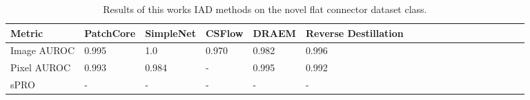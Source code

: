 \begin{table}[htbp]
    \tiny
    \centering
    \begin{tabularx}{\textwidth}{|X|X|X|X|X|X|X|X|X|X|X|X|X|X|X|X|X|X|}%
        \hline
        \textbf{Metric} & \textbf{PatchCore} \cite{patchCore2022} & \textbf{SimpleNet} \cite{liu2023simplenet} & \textbf{CSFlow }\cite{csflow2022} & \textbf{DRAEM} \cite{Zavrtanik_2021DRAEM} & \textbf{Reverse Destillation} \cite{revdist2023} \\
        \hline
        Image AUROC & 0.995 & 1.0 & 0.970 & 0.982 & 0.996 \\
        \hline
        Pixel AUROC & 0.993 & 0.984 & - & 0.995 & 0.992 \\
        \hline
        sPRO & - & - & - & - & - \\
        \hline
    \end{tabularx}
    \caption{Results of this works IAD methods on the novel flat connector dataset class.}
    \label{tab:flatconnectorperformance}
\end{table}
